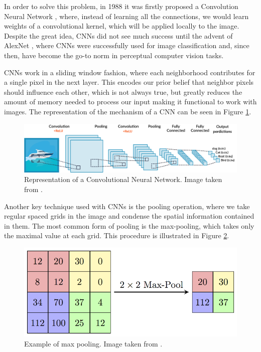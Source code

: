 In order to solve this problem, in 1988 it was firstly proposed a Convolution Neural Network \cite{cnn_gordo}, where, instead of learning all the connections, we would learn weights of a convolutional kernel, which will be applied locally to the image. Despite the great idea, CNNs did not see much success until the advent of AlexNet \cite{alex}, where CNNs were successfully used for image classification and, since then, have become the go-to norm in perceptual computer vision tasks. 

CNNs work in a sliding window fashion, where each neighborhood contributes for a single pixel in the next layer. This encodes our prior belief that neighbor pixels should influence each other, which is not always true, but greatly reduces the amount of memory needed to process our input making it functional to work with images. The representation of the mechanism of a CNN can be seen in Figure \ref{cnn}.

\begin{figure}[H]
    \includegraphics[width=\textwidth]{Cap2-Methods/image2.png}
    \centering
	\caption{Representation of a Convolutional Neural Network. Image taken from \cite{cnnimg}.}
	\label{cnn}
\end{figure}

Another key technique used with CNNs is the pooling operation, where we take regular spaced grids in the image and condense the spatial information contained in them. The most common form of pooling is the max-pooling, which takes only the maximal value at each grid. This procedure is illustrated in Figure \ref{pooling}.

\begin{figure}[H]
    \includegraphics[width=.7\textwidth]{Cap2-Methods/MaxpoolSample2.png}
    \centering
	\caption{Example of max pooling. Image taken from \cite{poolimg}.}
	\label{pooling}
\end{figure}

